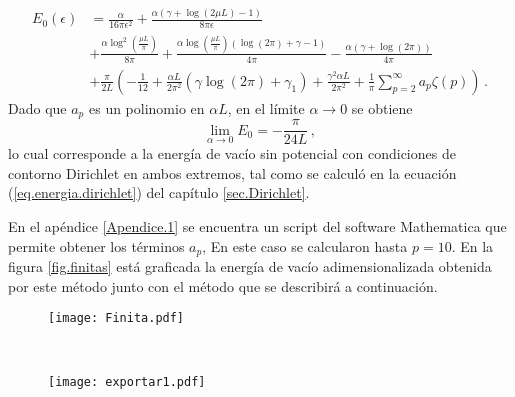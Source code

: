 \begin{align}\label{energia.vacio.final}
	E_ 0 (\epsilon )&=
		\frac{\alpha}{16  \pi  \epsilon ^2}	 
		+   \frac{
	    	\alpha ( \gamma  +  \log (2\mu L ) -1 ) }
	    	{8  \pi \epsilon } 
\\[5pt]
\nonumber
&+
	\frac{\alpha \log ^2 \left( \frac{\mu L}{\pi} \right)}{8 \pi}  +
		\frac{ 
			\alpha \log \left( \frac{\mu L}{\pi}\right)
				( \log (2 \pi ) + \gamma -1)}
			{4 \pi }  
	- \frac{\alpha (\gamma + \log (2 \pi ) )}{4 \pi}
\\[5pt]
\nonumber
&
+
	\frac{\pi}{2 L}  
			\left(
				- \frac{1}{12} +
				\frac{\alpha L}{2 \pi ^2} 
				\left(
					\gamma \log (2 \pi)
					+ \gamma _1
					\right) +
								\frac{\gamma ^2 \alpha L}{2 \pi ^2} +
								\frac{1}{\pi} \sum _{p=2} ^{\infty}
								a_p \zeta (p) 
							\right) 
\, .
\end{align}
Dado que $a _p$ es un polinomio en $\alpha L$, en el límite $\alpha \rightarrow 0$ se obtiene
\begin{equation}
\lim \limits_{\alpha \rightarrow 0} E _0 = 
		- \frac{\pi}{24 L}
\, ,
\end{equation}
lo cual corresponde a la energía de vacío sin potencial con condiciones de contorno Dirichlet en ambos extremos, tal como se calculó en la ecuación (\ref{eq.energia.dirichlet}) del capítulo \ref{sec.Dirichlet}.

En el apéndice \ref{Apendice.1} se encuentra un script del software Mathematica que permite obtener los términos $a _p$, En este caso se calcularon hasta $p=10$. En la figura \ref{fig.finitas} está graficada la energía de vacío adimensionalizada obtenida por este método junto con el método que se describirá a continuación.



\begin{figure*}[t!]
    \centering
    \begin{subfigure}[t]{0.5\textwidth}
        \centering
        \texttt{[image: Finita.pdf]}
        \caption{}
        \label{fig.izquierda}
    \end{subfigure}%
    ~ 
    \begin{subfigure}[t]{0.5\textwidth}
        \centering
        \texttt{[image: exportar1.pdf]}
        \caption{}
        \label{fig.derecha}
    \end{subfigure}
    \caption{En esta imagen se muestran dos posibles adimensionalizaciones de la energía de vacío, una vez obtenida la curva \ref{fig.izquierda} se pueden generar todas las curvas de la figura \ref{fig:vacios} haciendo los cambios de variables $\beta \rightarrow \alpha L$, $E _0 \rightarrow \frac{E _0}{\alpha}$.}
\label{fig.finitas}
\end{figure*}

